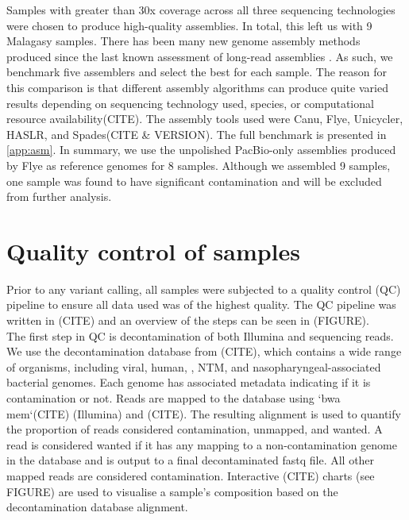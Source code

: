 Samples with greater than 30x coverage across all three sequencing technologies were chosen to produce high-quality assemblies. In total, this left us with 9 Malagasy samples. There has been many new genome assembly methods produced since the last known assessment of \mtb{} long-read assemblies \cite{bainomugisa2018}. As such, we benchmark five assemblers and select the best for each sample. The reason for this comparison is that different assembly algorithms can produce quite varied results depending on sequencing technology used, species, or computational resource availability(CITE). The assembly tools used were Canu, Flye, Unicycler, HASLR, and Spades(CITE \& VERSION). The full benchmark is presented in \autoref{app:asm}.
In summary, we use the unpolished PacBio-only assemblies produced by Flye as reference genomes for 8 samples. Although we assembled 9 samples, one sample was found to have significant contamination and will be excluded from further analysis.


\section{Quality control of samples}
\label{sec:ch2-qc}

Prior to any variant calling, all samples were subjected to a quality control (QC) pipeline to ensure all data used was of the highest quality. The QC pipeline was written in (CITE) and an overview of the steps can be seen in (FIGURE). \\
The first step in QC is decontamination of both Illumina and \ont{} sequencing reads. We use the decontamination database from (CITE), which contains a wide range of organisms, including viral, human, \mtb{}, NTM, and nasopharyngeal-associated bacterial genomes. Each genome has associated metadata indicating if it is contamination or not. Reads are mapped to the database using `bwa mem`(CITE) (Illumina) and (CITE). The resulting alignment is used to quantify the proportion of reads considered contamination, unmapped, and wanted. A read is considered wanted if it has any mapping to a non-contamination genome in the database and is output to a final decontaminated fastq file. All other mapped reads are considered contamination. Interactive (CITE) charts (see FIGURE) are used to visualise a sample's composition based on the decontamination database alignment.  

